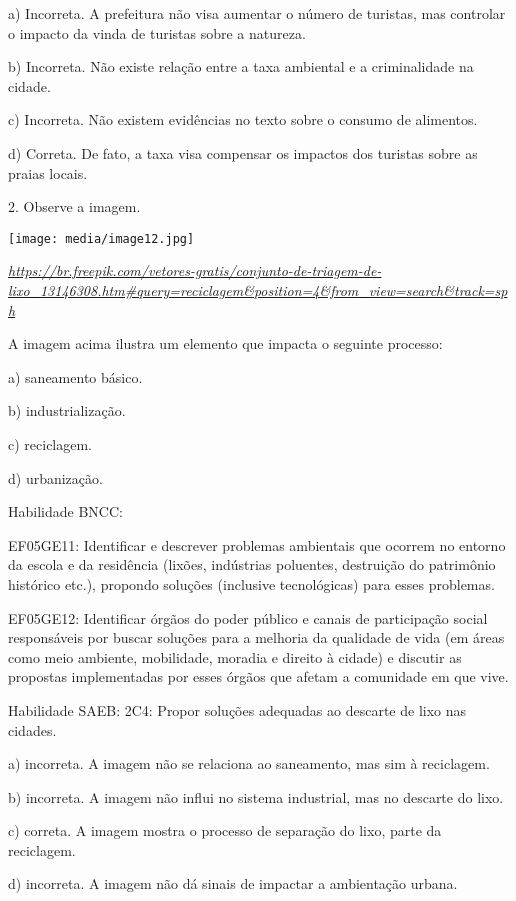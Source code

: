 a) Incorreta. A prefeitura não visa aumentar o número de turistas, mas
controlar o impacto da vinda de turistas sobre a natureza.

b) Incorreta. Não existe relação entre a taxa ambiental e a
criminalidade na cidade.

c) Incorreta. Não existem evidências no texto sobre o consumo de
alimentos.

d) Correta. De fato, a taxa visa compensar os impactos dos turistas
sobre as praias locais.

2. Observe a imagem.

\texttt{[image: media/image12.jpg]}

\href{https://br.freepik.com/vetores-gratis/conjunto-de-triagem-de-lixo_13146308.htm\#query=reciclagem\&position=4\&from_view=search\&track=sph}{\emph{https://br.freepik.com/vetores-gratis/conjunto-de-triagem-de-lixo\_13146308.htm\#query=reciclagem\&position=4\&from\_view=search\&track=sph}}

A imagem acima ilustra um elemento que impacta o seguinte processo:

a) saneamento básico.

b) industrialização.

c) reciclagem.

d) urbanização.

Habilidade BNCC:

EF05GE11: Identificar e descrever problemas ambientais que ocorrem no
entorno da escola e da residência (lixões, indústrias poluentes,
destruição do patrimônio histórico etc.), propondo soluções (inclusive
tecnológicas) para esses problemas.

EF05GE12: Identificar órgãos do poder público e canais de participação
social responsáveis por buscar soluções para a melhoria da qualidade de
vida (em áreas como meio ambiente, mobilidade, moradia e direito à
cidade) e discutir as propostas implementadas por esses órgãos que
afetam a comunidade em que vive.

Habilidade SAEB: 2C4: Propor soluções adequadas ao descarte de lixo nas
cidades.

a) incorreta. A imagem não se relaciona ao saneamento, mas sim à
reciclagem.

b) incorreta. A imagem não influi no sistema industrial, mas no descarte
do lixo.

c) correta. A imagem mostra o processo de separação do lixo, parte da
reciclagem.

d) incorreta. A imagem não dá sinais de impactar a ambientação urbana.

